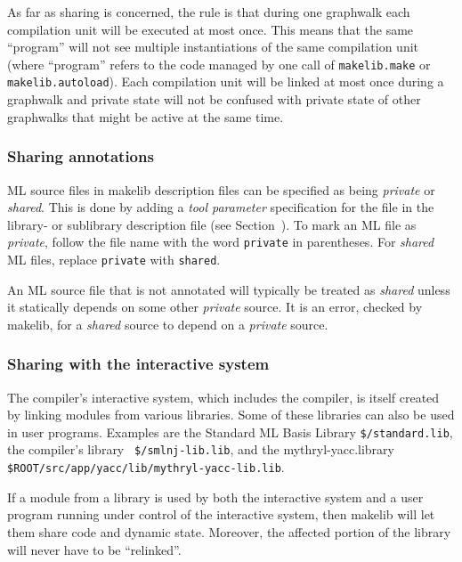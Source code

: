 As far as sharing is concerned, the rule is that during one graphwalk
each compilation unit will be executed at most once.  This means that
the same ``program'' will not see multiple instantiations of the same
compilation unit (where ``program'' refers to the code managed by one
call of {\tt makelib.make} or {\tt makelib.autoload}).  Each compilation unit
will be linked at most once during a graphwalk and private state
will not be confused with private state of other graphwalks that might
be active at the same time.


\subsubsection{Sharing annotations}

ML source files in makelib description files can be specified as being {\em
private} or {\em shared}.  This is done by adding a {\em tool
parameter} specification for the file in the library- or sublibrary
description file (see Section~). To mark an ML file
as {\em private}, follow the file name with the word {\tt private} in
parentheses.  For {\em shared} ML files, replace {\tt private} with
{\tt shared}.

An ML source file that is not annotated will typically be treated as
{\em shared} unless it statically depends on some other {\em private}
source.  It is an error, checked by makelib, for a {\em shared} source to
depend on a {\em private} source.

\subsubsection{Sharing with the interactive system}

The compiler's interactive system, which includes the compiler, is itself
created by linking modules from various libraries. Some of these
libraries can also be used in user programs.  Examples are the
Standard ML Basis Library {\tt \$/standard.lib}, the compiler's library {\tt
\$/smlnj-lib.lib}, and the mythryl-yacc.library {\tt \$ROOT/src/app/yacc/lib/mythryl-yacc-lib.lib}.

If a module from a library is used by both the interactive system and
a user program running under control of the interactive system, then
makelib will let them share code and dynamic state.  Moreover, the affected
portion of the library will never have to be ``relinked''.
